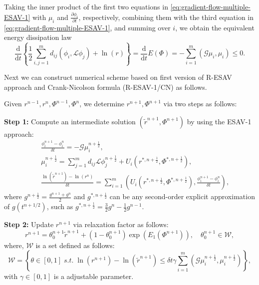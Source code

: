 \documentclass[final,review,onefignum,onetabnum]{siamart190516}
\theoremstyle{plain}
\begin{document}
Taking the inner product of the first two equations in \eqref{eq:gradient-flow-multiple-ESAV-1} with $\mu_{i}$ and $\frac{\partial \phi_{i}}{\partial t}$, respectively, 
combining them with the third equation in \eqref{eq:gradient-flow-multiple-ESAV-1}, and summing over $i$, we obtain the equivalent energy dissipation law
\begin{equation}
\frac{\mathrm{d}}{\mathrm{d} t}\left\{\frac{1}{2} \sum_{i, j=1}^{m} d_{i j}\left(\phi_{i}, \mathcal{L} \phi_{j}\right)+\ln(r)\right\}=\frac{\mathrm{d}}{\mathrm{d} t} E\left(\Phi\right)=-\sum_{i=1}^{m}\left(\mathcal{G} \mu_{i}, \mu_{i}\right) \leq 0.
\end{equation}

Next we can construct numerical scheme based on first version of R-ESAV approach and Crank-Nicolson formula (R-ESAV-1/CN) as follows. 
 
Given $r^{n-1}, r^{n}, \Phi^{n-1}, \Phi^{n}$, we determine $r^{n+1}, \Phi^{n+1}$ via two steps as follows:

\textbf{Step 1:} Compute an intermediate solution $(\tilde{r}^{n+1}, \Phi^{n+1})$ by using  the ESAV-1 approach:
\begin{eqnarray}
\label{eq:multiple-R-ESAV1-CN-1}
& & \frac{\phi_{i}^{n+1}-\phi_{i}^{n}}{\delta t} =-\mathcal{G} \mu_{i}^{n+\frac{1}{2}}, \\
\label{eq:multiple-R-ESAV1-CN-2}
& & \mu_{i}^{n+\frac{1}{2}} =\sum_{j=1}^{m}d_{ij} \mathcal{L} \phi_{j}^{n+\frac{1}{2}}+U_{i}\left(r^{*, n+\frac{1}{2}}, \Phi^{*, n+\frac{1}{2}}\right), \\ 
\label{eq:multiple-R-ESAV1-CN-3}
& & \frac{\ln(\tilde{r}^{n+1})-\ln(r^{n})}{\delta t} =\sum_{i=1}^{m} \left(U_{i}\left(r^{*, n+\frac{1}{2}}, \Phi^{*, n+\frac{1}{2}}\right), \frac{\phi_{i}^{n+1}-\phi_{i}^{n}}{\delta t}\right), 
\end{eqnarray}
where $g^{n+\frac{1}{2}}=\frac{g^{n+1}+g^{n}}{2}$ and $g^{*, n+\frac{1}{2}}$ can be any second-order explicit approximation of $g(t^{n+1/2})$, such as $g^{*, n+\frac{1}{2}}=\frac{3}{2}g^{n}-\frac{1}{2}g^{n-1}$.

\textbf{Step 2:} Update $r^{n+1}$ via relaxation factor as follows: 
\begin{equation}\label{eq:multiple-R-ESAV1-CN-4}
	r^{n+1} = \theta_{0}^{n+1} \tilde{r}^{n+1} + (1-\theta_{0}^{n+1})\exp\left(E_{1}(\Phi^{n+1})\right), \quad \theta_{0}^{n+1} \in \mathcal{W},
\end{equation}
where, $\mathcal{W}$ is a set defined as follows: 
\begin{equation}\label{eq:multiple-set-condition-ESAV1-CN}
	\mathcal{W}=\left\lbrace \theta\in [0,1] \; s.t. \; \ln(r^{n+1}) - \ln(\tilde r^{n+1}) \leq \delta t \gamma \sum_{i=1}^{m}\left(\mathcal{G} \mu_{i}^{n+\frac{1}{2}}, \mu_{i}^{n+\frac{1}{2}}\right) \right\rbrace,
\end{equation}
with $\gamma \in [0, 1]$ is a adjustable parameter. 
\end{document}

